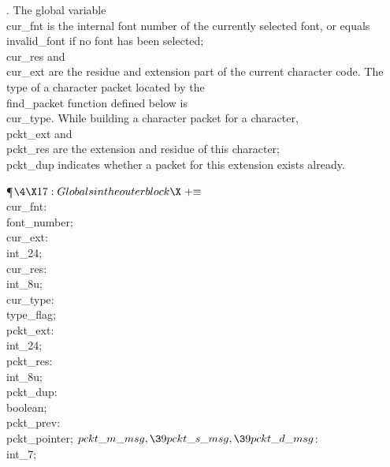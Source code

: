 . The global variable \\{cur\_fnt} is the internal font number of the
currently selected font, or equals \\{invalid\_font} if no font has
been selected; \\{cur\_res} and \\{cur\_ext} are the residue and extension
part of the current character code. The type of a character packet
located by the \\{find\_packet} function defined below is \\{cur\_type}.
While building a character packet for a character, \\{pckt\_ext} and
\\{pckt\_res} are the extension and residue of this character; \\{pckt\_dup}
indicates whether a packet for this extension exists already.

\Y\P$\4\X17:Globals in the outer block\X\mathrel{+}\S$\6
\4\\{cur\_fnt}: \\{font\_number};\6
\4\\{cur\_ext}: \\{int\_24};\6
\4\\{cur\_res}: \\{int\_8u};\6
\4\\{cur\_type}: \\{type\_flag};\6
\4\\{pckt\_ext}: \\{int\_24};\6
\4\\{pckt\_res}: \\{int\_8u};\6
\4\\{pckt\_dup}: \\{boolean};\6
\4\\{pckt\_prev}: \\{pckt\_pointer};\6
\4$\\{pckt\_m\_msg},\39\\{pckt\_s\_msg},\39\\{pckt\_d\_msg}$: \\{int\_7};%
\par
\fi

